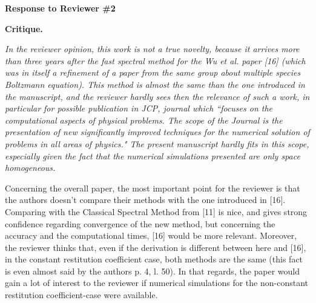 \documentclass[11pt]{article}
\begin{document}
\vspace{0.3in}
\centerline{{\large \bf{Response to Reviewer \#2}}}
\bigskip


{\bf Critique.} {\it In the reviewer opinion, this work is not a true novelty, because it arrives more than three years after the fast spectral method for the Wu et al. paper [16] (which was in itself a refinement of a paper from the same group about multiple species Boltzmann equation). This method is almost the same than the one introduced in the manuscript, and the reviewer hardly sees then the relevance of such a work, in particular for possible publication in JCP, journal which ``focuses on the computational aspects of physical problems. The scope of the Journal is the presentation of new significantly improved techniques for the numerical solution of problems in all areas of physics." The present manuscript hardly fits in this scope, especially given the fact that the numerical simulations presented are only space homogeneous.

Concerning the overall paper, the most important point for the reviewer is that the authors doesn't compare their methods with the one introduced in [16]. Comparing with the Classical Spectral Method from [11] is nice, and gives strong confidence regarding convergence of the new method, but concerning the accuracy and the computational times, [16] would be more relevant. Moreover, the reviewer thinks that, even if the derivation is different between here and [16], in the constant restitution coefficient case, both methods are the same (this fact is even almost said by the authors p. 4, l. 50). In that regards, the paper would gain a lot of interest to the reviewer if numerical simulations for the non-constant restitution coefficient-case were available.
}
\end{document}
